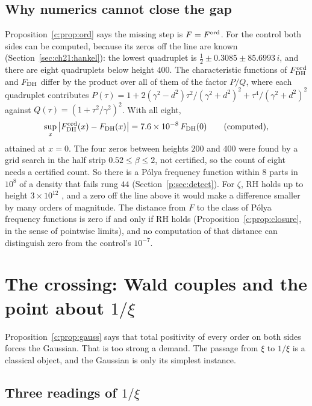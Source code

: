 \subsection{Why numerics cannot close the gap}

Proposition~\ref{c:prop:ord} says the missing step is $F=F^{\rm ord}$. For the control both sides can be computed, because its zeros off the line are known (Section~\ref{sec:ch21:hankel}): the lowest quadruplet is $\frac12\pm0.3085\pm85.6993\,i$, and there are eight quadruplets below height $400$. The characteristic functions of $F^{\rm ord}_{\rm DH}$ and $F_{\rm DH}$ differ by the product over all of them of the factor $P/Q$, where each quadruplet contributes $P(\tau)=1+2(\gamma^2-d^2)\tau^2/(\gamma^2+d^2)^2+\tau^4/(\gamma^2+d^2)^2$ against $Q(\tau)=(1+\tau^2/\gamma^2)^2$. With all eight,
\[
\sup_x\big|F^{\rm ord}_{\rm DH}(x)-F_{\rm DH}(x)\big|=7.6\times10^{-8}\,F_{\rm DH}(0)\qquad(\text{computed}),
\]
attained at $x=0$. The four zeros between heights $200$ and $400$ were found by a grid search in the half strip $0.52\le\beta\le2$, not certified, so the count of eight needs a certified count.
So there is a P\'olya frequency function within $8$ parts in $10^8$ of a density that fails rung $44$ (Section~\ref{p:sec:detect}). For $\zeta$, RH holds up to height $3\times10^{12}$ \cite{PT21}, and a zero off the line above it would make a difference smaller by many orders of magnitude. The distance from $F$ to the class of P\'olya frequency functions is zero if and only if RH holds (Proposition~\ref{c:prop:closure}, in the sense of pointwise limits), and no computation of that distance can distinguish zero from the control's $10^{-7}$.

\section{The crossing: Wald couples and the point about \texorpdfstring{$1/\xi$}{1/xi}}\label{c:sec:wald}

Proposition~\ref{c:prop:gauss} says that total positivity of every order on both sides forces the Gaussian. That is too strong a demand. The passage from $\xi$ to $1/\xi$ is a classical object, and the Gaussian is only its simplest instance.

\subsection{Three readings of \texorpdfstring{$1/\xi$}{1/xi}}

